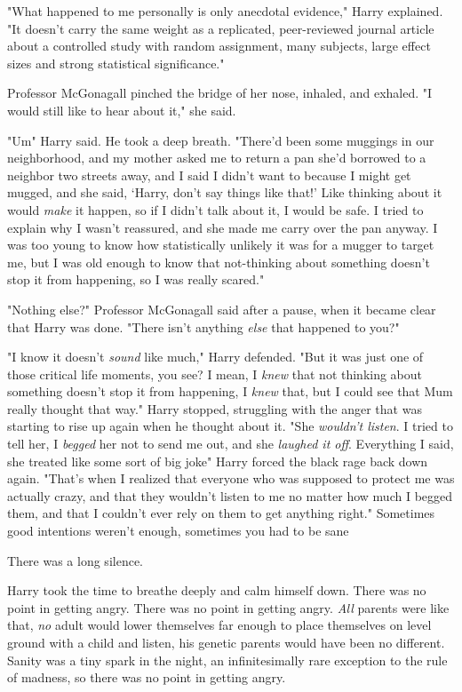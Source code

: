 "What happened to me personally is only anecdotal evidence," Harry explained.
"It doesn't carry the same weight as a replicated, peer-reviewed journal
article about a controlled study with random assignment, many subjects, large
effect sizes and strong statistical significance."

Professor McGonagall pinched the bridge of her nose, inhaled, and exhaled. "I
would still like to hear about it," she said.

"Um{\el}" Harry said. He took a deep breath. "There'd been some muggings in
our neighborhood, and my mother asked me to return a pan she'd borrowed to a
neighbor two streets away, and I said I didn't want to because I might get
mugged, and she said, `Harry, don't say things like that!' Like thinking about
it would \emph{make} it happen, so if I didn't talk about it, I would be safe.
I tried to explain why I wasn't reassured, and she made me carry over the pan
anyway. I was too young to know how statistically unlikely it was for a mugger
to target me, but I was old enough to know that not-thinking about something
doesn't stop it from happening, so I was really scared."

"Nothing else?" Professor McGonagall said after a pause, when it became clear
that Harry was done. "There isn't anything \emph{else} that happened to you?"

"I know it doesn't \emph{sound} like much," Harry defended. "But it was just
one of those critical life moments, you see? I mean, I \emph{knew} that not
thinking about something doesn't stop it from happening, I \emph{knew} that,
but I could see that Mum really thought that way." Harry stopped, struggling
with the anger that was starting to rise up again when he thought about it.
"She \emph{wouldn't listen}. I tried to tell her, I \emph{begged} her not to
send me out, and she \emph{laughed it off}. Everything I said, she treated like
some sort of big joke{\el}" Harry forced the black rage back down again.
"That's when I realized that everyone who was supposed to protect me was
actually crazy, and that they wouldn't listen to me no matter how much I begged
them, and that I couldn't ever rely on them to get anything right." Sometimes
good intentions weren't enough, sometimes you had to be sane{\el}

There was a long silence.

Harry took the time to breathe deeply and calm himself down. There was no point
in getting angry. There was no point in getting angry. \emph{All} parents were
like that, \emph{no} adult would lower themselves far enough to place
themselves on level ground with a child and listen, his genetic parents would
have been no different. Sanity was a tiny spark in the night, an
infinitesimally rare exception to the rule of madness, so there was no point in
getting angry.

